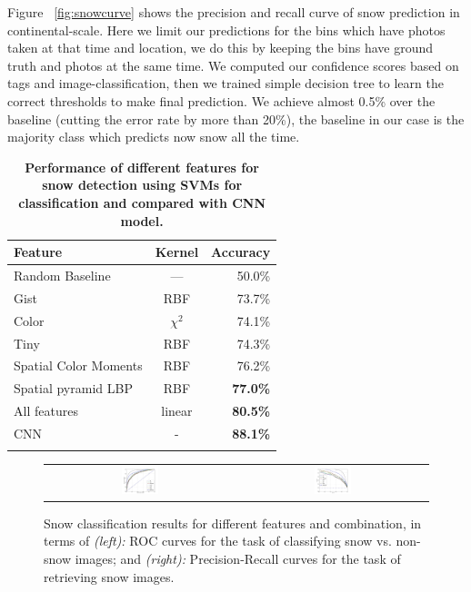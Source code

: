 Figure ~\ref{fig:snowcurve} shows the precision and recall curve of snow prediction in 
continental-scale.
Here we limit our predictions for the bins which have photos taken at that 
time and location, we do this by keeping the bins have ground truth and photos at the same time. 
We computed our confidence scores based on tags and image-classification, then we trained 
simple decision tree to learn the correct thresholds to make final prediction. We achieve 
almost 0.5\% over the baseline (cutting the error rate by more than 20\%), the baseline in 
our case is the majority class which predicts now snow all the time. 



\begin{table}[th!]\centering
\caption{\textbf{Performance of different features for snow detection using SVMs for classification and compared with CNN model.}}
\label{tab:snow}
\tiny
\begin{tabular}{@{}lcr@{}}\toprule
Feature & Kernel & Accuracy\\\midrule
Random Baseline & --- & 50.0\%\\
Gist & RBF & 73.7\%\\
Color  & $\chi^2$ & 74.1\%\\
Tiny & RBF & 74.3\%\\
Spatial Color Moments & RBF & 76.2\%\\
Spatial pyramid LBP & RBF &\textbf{77.0\%}\\\midrule
All features  & linear & \textbf{80.5\%}\\
CNN& -& \textbf{88.1\%}\\
\bottomrule\\
\end{tabular}
\end{table}


\begin{figure}[th!]
\begin{center}
\vspace{-16pt}
\begin{tabular}{cc}
 \includegraphics[width=0.2\textwidth]{figure/ROC-CNN-curves.jpg} &
\includegraphics[width=0.2\textwidth]{figure/PR-CNN-curves.jpg} \\
\end{tabular}
\end{center}
\vspace{-8pt}
\caption{
Snow classification results for different features and combination, in terms of {\textit{(left):}} ROC curves for the task of classifying snow vs. non-snow images; and 
{\textit{(right):}} Precision-Recall curves for the task of retrieving snow images.
}
\label{fig:PR_ROC_snow}
\end{figure}


